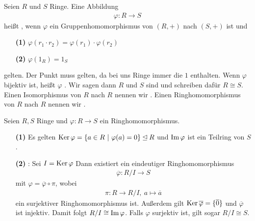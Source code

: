 \begin{df}\label{skript:8.4}
	Seien $R$ und $S$ Ringe.
	Eine Abbildung 
	\begin{align*}
	\varphi : R \to S
	\end{align*}
	heißt , wenn $\varphi$ ein Gruppenhomomorphismus von $(R,+)$ nach $(S,+)$ ist
	und
	\begin{enumerate}
		\item[\textbf{(1)}]
		$\varphi(r_1 \cdot r_2 ) = \varphi(r_1) \cdot \varphi(r_2)$
		
		\item[\textbf{(2)}]
		$ \varphi(1_R) = 1_S$
	\end{enumerate}
	gelten. Der Punkt muss gelten, da bei uns Ringe immer die $1$ enthalten.
	Wenn $\varphi$ bijektiv ist, heißt $\varphi$ .
	Wir sagen dann $R$ und $S$ sind  und schreiben dafür $R \cong S$.
	Einen Isomorphismus von $R$ nach $R$ nennen wir .
	Einen Ringhomomorphismus von $R$ nach $R$ nennen wir .
\end{df}

\begin{sz}\label{skript:8.5}
	Seien $R,S$ Ringe und $\varphi :R \to S$ ein Ringhomomorphismus.
	\begin{enumerate}
		\item[\textbf{(1)}]
		Es gelten $\Ker \varphi = \lbrace a \in R \ | \ \varphi(a) = 0 \rbrace \unlhd R$
		und $\operatorname{Im} \varphi $ ist ein Teilring von $S$.
		
		\item[\textbf{(2)}]:
		Sei $I = \operatorname{Ker} \varphi$ Dann existiert ein eindeutiger Ringhomomorphismus
		\begin{align*}
		\overline{\varphi} : R/I \to S
		\end{align*}
		mit $ \varphi = \overline{\varphi} \circ \pi$, wobei 
		\begin{align*}
		\pi : R \to R/I, \ a \mapsto \overline{a}
		\end{align*}
		ein surjektiver Ringhomomorphismus ist.
		Außerdem gilt $\operatorname{Ker} \overline{\varphi} = \lbrace \overline{0} \rbrace $ und $\overline{\varphi}$ ist injektiv.
		Damit folgt $R/I \cong \operatorname{Im} \varphi$. Falls $\varphi$ surjektiv ist, gilt sogar $R/I \cong S$.
	\end{enumerate}
\end{sz}

